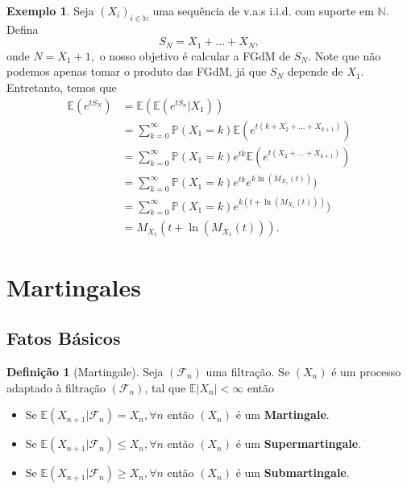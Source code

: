 \documentclass[12pt,a4paper,oneside]{book}
\theoremstyle{definition}
\newtheorem{definition}[theorem]{Defini\c{c}\~ao}
\newtheorem{example}[theorem]{Exemplo}
\theoremstyle{remark}
\numberwithin{equation}{section}
\newcommand{\N}{\mathbb{N}}
\newcommand{\E}{\mathbb{E}}
\newcommand{\pr}{\mathbb{P}}
\begin{document}
\begin{example}
Seja $(X_i)_{i\in \N}$ uma sequência de v.a.s i.i.d. com suporte em $\N.$ Defina
$$S_N = X_1+\dots+X_N, $$
onde $N=X_1+1,$ o nosso objetivo é calcular a FGdM de $S_N$. Note que não podemos  apenas tomar o produto das FGdM, já que $S_N$ depende de $X_1.$ Entretanto, temos que 
\begin{align*}
\E(e^{tS_N}) &= \E(\E(e^{tS_n}|X_1))\\
& = \sum_{k=0}^\infty\pr(X_1=k )\E(e^{t(k+X_2+\dots+X_{k+1})}) \\
& = \sum_{k=0}^\infty\pr(X_1=k )e^{tk}\E(e^{t(X_2+\dots+X_{k+1})}) \\
& = \sum_{k=0}^\infty\pr(X_1=k )e^{tk}e^{k\ln(M_{X_1}(t))}) \\
& = \sum_{k=0}^\infty\pr(X_1=k )e^{k(t+\ln(M_{X_1}(t)))}) \\
& = M_{X_1}(t+ \ln(M_{X_1}(t))).
\end{align*}


\end{example}

















\newpage
\section{Martingales}

\subsection{Fatos Básicos }

\begin{definition}[Martingale] Seja $(\mathcal{F}_n)$ uma filtração. Se $(X_n)$ é um processo  adaptado à filtração $(\mathcal{F}_n)$, tal que $\E|X_n|<\infty$ então 
\begin{itemize}
\item Se $\E(X_{n+1}|\mathcal{F}_n) = X_n, \forall n$ então $(X_n)$ é um \textbf{Martingale}.
\item Se $\E(X_{n+1}|\mathcal{F}_n) \leq X_n, \forall n$ então $(X_n)$ é um \textbf{Supermartingale}.
\item Se $\E(X_{n+1}|\mathcal{F}_n) \geq X_n, \forall n$ então $(X_n)$ é um \textbf{Submartingale}.
\end{itemize}
\end{definition}
\end{document}
